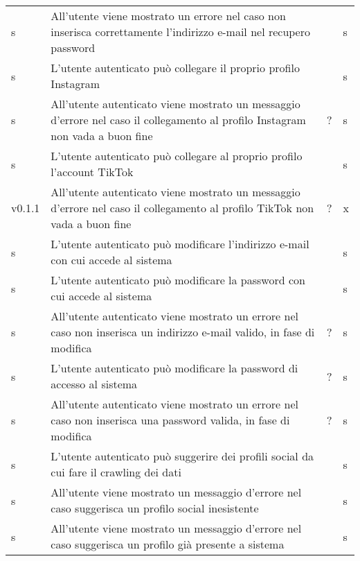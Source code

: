 \begin{longtable}{ m{}<{\centering}  m{}<{\centering}  m{}<{\centering}  m{}<{\centering}}
	 \rowcolor{gray!25} s & All’utente viene mostrato un errore nel caso non inserisca correttamente l’indirizzo e-mail nel recupero password & \Ob & s\\	
	 
	 s & L’utente autenticato può collegare il proprio profilo Instagram  & \De & s\\	
	 
	 \rowcolor{gray!25} s & All’utente autenticato viene mostrato un messaggio d’errore nel caso il collegamento al profilo Instagram non vada a buon fine & \De ? & s\\	
	 
	 s & L’utente autenticato può collegare al proprio profilo l’account TikTok & \De & s\\		 

	\rowcolor{gray!25} v0.1.1 & All’utente autenticato viene mostrato un messaggio d’errore nel caso il collegamento al profilo TikTok non vada a buon fine  & \De ? & x \\	

	 s & L’utente autenticato può modificare l'indirizzo e-mail con cui accede al sistema & \Fa & s\\		
	 
	 \rowcolor{gray!25} s & L’utente autenticato può modificare la password con cui accede al sistema & \Fa & s\\		
	 
	 s & All’utente autenticato viene mostrato un errore nel caso non inserisca un indirizzo e-mail valido, in fase di modifica & \Fa ? & s\\		
	 
	 \rowcolor{gray!25} s & L’utente autenticato può modificare la password di accesso al sistema & \Fa ? & s\\		
	 
	 s & All’utente autenticato viene mostrato un errore nel caso non inserisca una password valida, in fase di modifica  & \Fa ? & s\\			
	  	 	 	
	 \rowcolor{gray!25} s & L’utente autenticato può suggerire dei profili social da cui fare il crawling dei dati & \Ob & s\\		
	 
	 s & All’utente viene mostrato un messaggio d’errore nel caso suggerisca un profilo social inesistente & \De & s\\		
	 
	 \rowcolor{gray!25} s & All’utente viene mostrato un messaggio d’errore nel caso suggerisca un profilo già presente a sistema & \De & s\\		
	 

\end{longtable}
